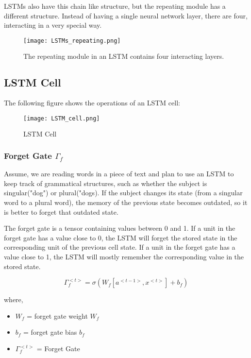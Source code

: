 LSTMs also have this chain like structure, but the repeating module has a different structure. Instead of having a single neural network layer, there are four, interacting in a very special way.


\begin{figure}[H]
    \centering
    \texttt{[image: LSTMs\_repeating.png]}
    \caption{The repeating module in an LSTM contains four interacting layers.}
    \label{fig:LSTMs_repeating}
\end{figure}

\subsection{LSTM Cell}
The following figure shows the operations of an LSTM cell:
\begin{figure}[H]
    \centering
    \texttt{[image: LSTM\_cell.png]}
    \caption{LSTM Cell}
    \label{fig:LSTMs_cell}
\end{figure}

\subsubsection{Forget Gate $\Gamma _f$}
Assume, we are reading words in a piece of text and plan to use an LSTM to keep track of grammatical structures, such as whether the subject is singular("dog") or plural("dogs). If the subject changes its state (from a singular word to a plural word), the memory of the previous state becomes outdated, so it is better to forget that outdated state.

The forget gate is a tensor containing values between 0 and 1. If a unit in the forget gate has a value close to 0, the LSTM will forget the stored state in the corresponding unit of the previous cell state. If a unit in the forget gate has a value close to 1, the LSTM will mostly remember the corresponding value in the stored state.

\begin{equation}
    \Gamma _f ^{<t>} = \sigma (W_f[a^{<t - 1>}, x^{<t>}] + b_f)
\end{equation}

where,
\begin{itemize}
    \item $W_f$ = forget gate weight $W_f$
    \item $b_f$ = forget gate bias $b_f$ 
    \item $\Gamma _f ^ {<t>}$ = Forget Gate
\end{itemize}

